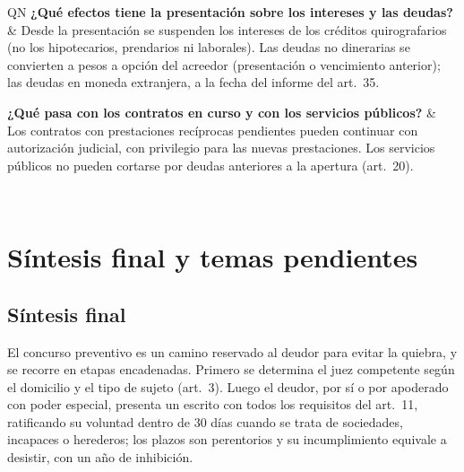 \documentclass[12pt,oneside]{book}
\begin{document}
\begin{longtable}{QN}
\textbf{¿Qué efectos tiene la presentación sobre los intereses y las deudas?} &
Desde la presentación se suspenden los intereses de los créditos quirografarios (no los hipotecarios, prendarios ni laborales). Las deudas no dinerarias se convierten a pesos a opción del acreedor (presentación o vencimiento anterior); las deudas en moneda extranjera, a la fecha del informe del art.~35. \\
\addlinespace[0.6em]

\textbf{¿Qué pasa con los contratos en curso y con los servicios públicos?} &
Los contratos con prestaciones recíprocas pendientes pueden continuar con autorización judicial, con privilegio para las nuevas prestaciones. Los servicios públicos no pueden cortarse por deudas anteriores a la apertura (art.~20). \\
\midrule

 \\
\bottomrule
\end{longtable}

\chapter[Síntesis final y temas pendientes]{Síntesis final y temas pendientes}

\section{Síntesis final}

El concurso preventivo es un camino reservado al deudor para evitar la quiebra, y se recorre en etapas encadenadas. Primero se determina el juez competente según el domicilio y el tipo de sujeto (art.~3). Luego el deudor, por sí o por apoderado con poder especial, presenta un escrito con todos los requisitos del art.~11, ratificando su voluntad dentro de 30 días cuando se trata de sociedades, incapaces o herederos; los plazos son perentorios y su incumplimiento equivale a desistir, con un año de inhibición.
\end{document}

